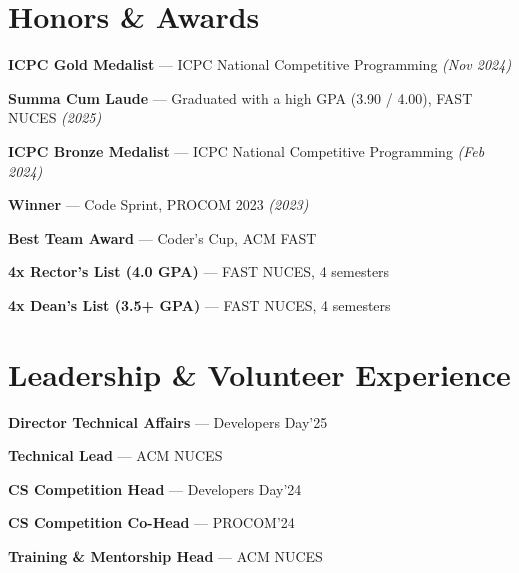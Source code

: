 \documentclass[10pt,a4paper]{article}
\begin{document}
\section{Honors \& Awards}
\begin{tight}
  \item \textbf{ICPC Gold Medalist} — ICPC National Competitive Programming \textit{(Nov 2024)}
  \item \textbf{Summa Cum Laude} — Graduated with a high GPA (3.90 / 4.00), FAST NUCES \textit{(2025)}
  \item \textbf{ICPC Bronze Medalist} — ICPC National Competitive Programming \textit{(Feb 2024)}
  \item \textbf{Winner} — Code Sprint, PROCOM 2023 \textit{(2023)}
  \item \textbf{Best Team Award} — Coder's Cup, ACM FAST
  \item \textbf{4x Rector's List (4.0 GPA)} — FAST NUCES, 4 semesters
  \item \textbf{4x Dean's List (3.5+ GPA)} — FAST NUCES, 4 semesters
\end{tight}

\section{Leadership \& Volunteer Experience}
\begin{tight}
  \item \textbf{Director Technical Affairs} — Developers Day'25
  \item \textbf{Technical Lead} — ACM NUCES
  \item \textbf{CS Competition Head} — Developers Day'24
  \item \textbf{CS Competition Co-Head} — PROCOM'24
  \item \textbf{Training \& Mentorship Head} — ACM NUCES
\end{tight}
\end{document}
